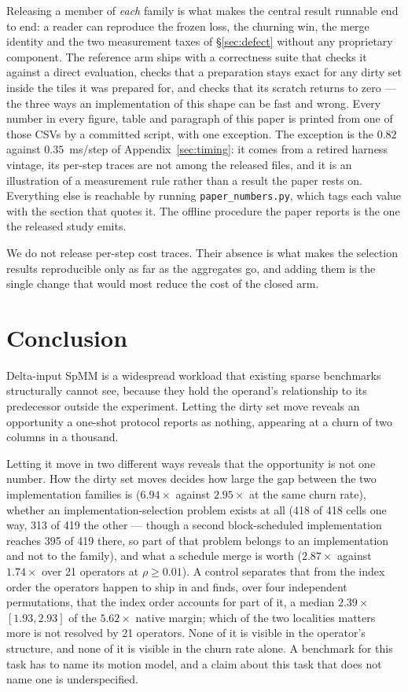 \documentclass{article}
\begin{document}
Releasing a member of \emph{each} family is what makes the central result
runnable end to end: a reader can reproduce the frozen loss, the churning win,
the merge identity and the two measurement taxes of \S\ref{sec:defect} without
any proprietary component. The reference arm ships with a correctness suite
that checks it against a direct evaluation, checks that a preparation stays
exact for any dirty set inside the tiles it was prepared for, and checks that
its scratch returns to zero --- the three ways an implementation of this shape
can be fast and wrong. Every number in every
figure, table and paragraph of this paper is printed from one of those CSVs by a
committed script, with one exception. The exception is the $0.82$ against
$0.35$~ms/step of Appendix~\ref{sec:timing}: it comes from a retired harness vintage,
its per-step traces are not among the released files, and it is an illustration
of a measurement rule rather than a result the paper rests on. Everything else
is reachable by running \texttt{paper\_numbers.py}, which tags each value with
the section that quotes it. The offline procedure the paper reports is the one
the released study emits.

We do not release per-step cost traces. Their absence is what makes the selection
results reproducible only as far as the aggregates go, and adding them is the
single change that would most reduce the cost of the closed arm.

\section{Conclusion}

Delta-input SpMM is a widespread workload that existing sparse benchmarks
structurally cannot see, because they hold the operand's relationship to its
predecessor outside the experiment. Letting the dirty set move reveals an
opportunity a one-shot protocol reports as nothing, appearing at a churn of two
columns in a thousand.

Letting it move in two different ways reveals that the opportunity is not one
number. How the dirty set moves decides how large the gap between the two
implementation families is ($6.94\times$ against $2.95\times$ at the same churn
rate), whether an implementation-selection problem exists at all (418 of 418
cells one way, 313 of 419 the other --- though a second block-scheduled
implementation reaches 395 of 419 there, so part of that problem belongs to an
implementation and not to the family), and what a schedule merge is worth
($2.87\times$ against $1.74\times$ over 21 operators at $\rho \geq 0.01$). A
control separates that from the index order the operators happen to ship in and
finds, over four independent permutations, that the index order accounts for
part of it, a median $2.39\times$ $[1.93, 2.93]$ of the $5.62\times$ native
margin; which of the two localities
matters more is not resolved by 21 operators. None of it is visible in the
operator's structure, and none of it is visible in the churn rate alone. A
benchmark for this task has to name its motion model, and a claim about this
task that does not name one is underspecified.
\end{document}
